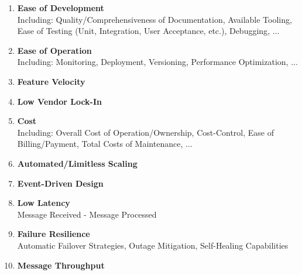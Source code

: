 \begin{enumerate}[nolistsep]
    \item \textbf{Ease of Development}\\
        Including: Quality/Comprehensiveness of Documentation, Available Tooling, Ease of Testing (Unit, Integration, User Acceptance, etc.), Debugging, ...
    \item \textbf{Ease of Operation}\\
        Including: Monitoring, Deployment, Versioning, Performance Optimization, ...
    \item \textbf{Feature Velocity}
    \item \textbf{Low Vendor Lock-In}
    \item \textbf{Cost}\\
        Including: Overall Cost of Operation/Ownership, Cost-Control, Ease of Billing/Payment, Total Costs of Maintenance, ...
    \item \textbf{Automated/Limitless Scaling}
    \item \textbf{Event-Driven Design}
    \item \textbf{Low Latency}\\
         Message Received - Message Processed
    \item \textbf{Failure Resilience}\\
         Automatic Failover Strategies, Outage Mitigation, Self-Healing Capabilities
    \item \textbf{Message Throughput}
\end{enumerate}

